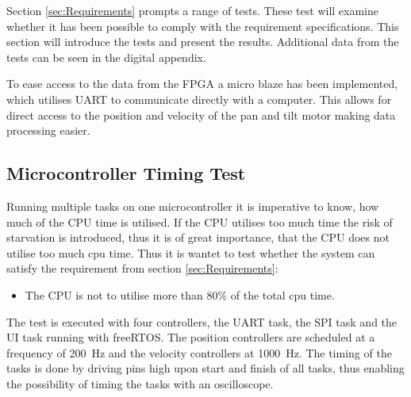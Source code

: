 \documentclass[../../main.tex]{subfiles}
\begin{document}
Section \ref{sec:Requirements} prompts a range of tests. These test will examine whether it has been possible to comply with the requirement specifications. This section will introduce the tests and present the results. Additional data from the tests can be seen in the digital appendix. 

To ease access to the data from the FPGA a micro blaze has been implemented, which utilises UART to communicate directly with a computer. This allows for direct access to the position and velocity of the pan and tilt motor making data processing easier. 
\subsection{Microcontroller Timing Test}
Running multiple tasks on one microcontroller it is imperative to know, how much of the CPU time is utilised. If the CPU utilises too much time the risk of starvation is introduced, thus it is of great importance, that the CPU does not utilise too much cpu time. Thus it is wantet to test whether the system can satisfy the requirement from section \ref{sec:Requirements}: 
\begin{itemize}
    \item The CPU is not to utilise more than 80\% of the total cpu time.
\end{itemize}

The test is executed with four controllers, the UART task, the SPI task and the UI task running with freeRTOS. The position controllers are scheduled at a frequency of \SI{200}{\hertz} and the velocity controllers at \SI{1000}{\hertz}. The timing of the tasks is done by driving pins high upon start and finish of all tasks, thus enabling the possibility of timing the tasks with an oscilloscope.
\end{document}
